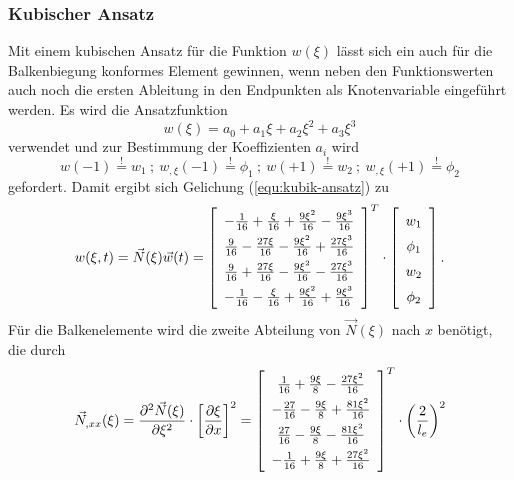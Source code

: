 \documentclass[a4paper,10pt,twoside]{article}
\numberwithin{equation}{section} %
\numberwithin{figure}{section}   %
\numberwithin{table}{section}    %
\begin{document}
	\subsubsection{Kubischer Ansatz} \label{sec:kubischer ansatz}
	Mit einem kubischen Ansatz für die Funktion $ w(\xi) $ lässt sich ein auch für die Balkenbiegung konformes Element gewinnen, wenn neben den Funktionswerten auch noch die ersten Ableitung in den Endpunkten als Knotenvariable eingeführt werden. Es wird die Ansatzfunktion
	\begin{equation}\label{equ:kubik-ansatz}
	w(\xi) = a_{0} + a_{1}\xi + a_{2}\xi^{2} + a_{3}\xi^{3}
	\end{equation}
	verwendet und  zur Bestimmung der Koeffizienten $a_{i}$ wird
	\begin{equation}\label{equ:kubik-ansatz-forderungen}
	w(-1)\overset{!}{=}w_{1} \ ; \ w_{,\xi}(-1)\overset{!}{=}\phi_{1} \ ; \ w(+1)\overset{!}{=}w_{2} \ ; \ w_{,\xi}(+1)\overset{!}{=}\phi_{2}
	\end{equation}
	gefordert. Damit ergibt sich Gelichung (\ref{equ:kubik-ansatz}) zu 
	\begin{equation}\label{equ:kubik-ansatz-eingesetzt}
	\renewcommand\arraystretch{1.5}
	w(\xi,t) = 
	\vec{N}(\xi) \vec{w}(t)
	=
	\left[ 
	\begin{array}{c}
	-\frac{1}{16}+\frac{\xi}{16}+\frac{9\xi^{2}}{16}-\frac{9\xi^{3}}{16}\\
	\frac{9}{16}-\frac{27\xi}{16}-\frac{9\xi^{2}}{16}+\frac{27\xi^{3}}{16}\\
	\frac{9}{16}+\frac{27\xi}{16}-\frac{9\xi^{2}}{16}-\frac{27\xi^{3}}{16}\\
	-\frac{1}{16}-\frac{\xi}{16}+\frac{9\xi^{2}}{16}+\frac{9\xi^{3}}{16}
	\end{array}
	\right]^{T} \cdot
	\left[ 
	\begin{array}{c}
	w_{1}\\
	\phi_{1}\\
	w_{2}\\
	\phi_{2}
	\end{array}
	\right]. 	
	\end{equation}
	Für die Balkenelemente wird die zweite Abteilung von $ \vec{N}(\xi) $ nach $x$ benötigt, die durch
	\begin{equation}\label{equ:kubik-N-Abteilung}
	\renewcommand\arraystretch{1.5}
	\vec{N}_{,xx}(\xi) = \frac{\partial^{2} \vec{N}(\xi)}{\partial \xi^{2}} \cdot \left[ \frac{\partial \xi}{\partial x} \right]^{2} = 
	\left[ 
	\begin{array}{c}
	\frac{1}{16}+\frac{9\xi}{8}-\frac{27\xi^{2}}{16}\\
	-\frac{27}{16}-\frac{9\xi}{8}+\frac{81\xi^{2}}{16}\\
	\frac{27}{16}-\frac{9\xi}{8}-\frac{81\xi^{2}}{16}\\
	-\frac{1}{16}+\frac{9\xi}{8}+\frac{27\xi^{2}}{16}
	\end{array}
	\right]^{T} \cdot \left(\frac{2}{l_{e}}\right)^{2}
	\end{equation}
\end{document}
